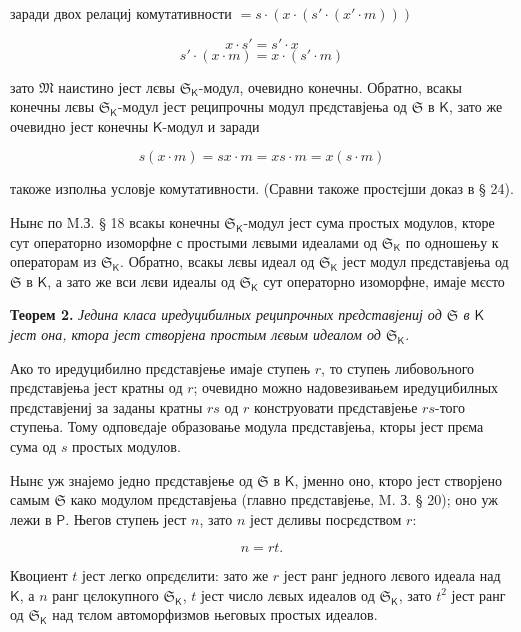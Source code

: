 \documentclass[11pt]{article}
\begin{document}
заради двох релациј комутативности \(=s\cdot(x\cdot(s'\cdot(x'\cdot m)))\)

\[
x\cdot s'=s'\cdot x
\]
\[
s'\cdot(x\cdot m)=x\cdot(s'\cdot m)
\]

зато \(\mathfrak M\) наистино јест лєвы \(\mathfrak S_{\mathsf K}\)-модул, очевидно конечны. Обратно, всакы конечны лєвы \(\mathfrak S_{\mathsf K}\)-модул јест реципрочны модул прєдставјења од \(\mathfrak S\) в \(\mathsf K\), зато же очевидно јест конечны \(\mathsf K\)-модул и заради

\[
s(x\cdot m)=sx\cdot m=xs\cdot m=x(s\cdot m)
\]

такоже изполња условје комутативности. (Сравни такоже простєјши доказ в § 24).

Нынє по M.З. § 18 всакы конечны \(\mathfrak S_{\mathsf K}\)-модул јест сума простых модулов, кторе сут операторно изоморфне с простыми лєвыми идеалами од \(\mathfrak S_{\mathsf K}\) по одношењу к операторам из \(\mathfrak S_{\mathsf K}\). Обратно, всакы лєвы идеал од \(\mathfrak S_{\mathsf K}\) јест модул прєдставјења од \(\mathfrak S\) в \(\mathsf K\), а зато же вси лєви идеалы од \(\mathfrak S_{\mathsf K}\) сут операторно изоморфне, имаје мєсто

\textbf{Теорем 2.} \emph{Једина класа иредуцибилных реципрочных прєдставјениј од \(\mathfrak S\) в \(\mathsf K\) јест она, ктора јест створјена простым лєвым идеалом од \(\mathfrak S_{\mathsf K}\).}

Ако то иредуцибилно прєдставјење имаје ступењ \(r\), то ступењ либовољного прєдставјења јест кратны од \(r\); очевидно можно надовезивањем иредуцибилных прєдставјениј за заданы кратны \(rs\) од \(r\) конструовати прєдставјење \(rs\)-того ступења. Тому одповєдаје образовање модула прєдставјења, кторы јест прєма сума од \(s\) простых модулов.

Нынє уж знајемо једно прєдставјење од \(\mathfrak S\) в \(\mathsf K\), јменно оно, кторо јест створјено самым \(\mathfrak S\) како модулом прєдставјења (главно прєдставјење, M. З. § 20); оно уж лежи в \(\mathsf P\). Његов ступењ јест \(n\), зато \(n\) јест дєливы посрєдством \(r\):

\[
n=rt.
\]

Квоциент \(t\) јест легко опрєдєлити: зато же \(r\) јест ранг једного лєвого идеала над \(\mathsf K\), а \(n\) ранг цєлокупного \(\mathfrak S_{\mathsf K}\), \(t\) јест число лєвых идеалов од \(\mathfrak S_{\mathsf K}\), зато \(t^2\) јест ранг од \(\mathfrak S_{\mathsf K}\) над тєлом автоморфизмов његовых простых идеалов.
\end{document}
